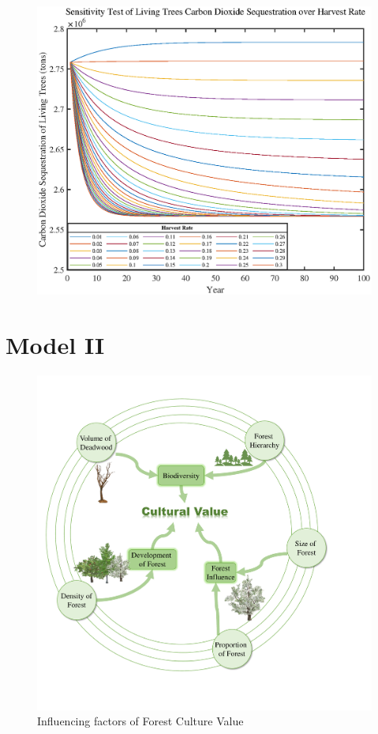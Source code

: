 \documentclass{mcmthesis}
\numberwithin{figure}{section}
\numberwithin{table}{section}
\numberwithin{equation}{section}
\begin{document}
\begin{figure}[htbp]
  \centering
  \includegraphics[width = 12cm]{code&pic/LivingTrees.eps}
\end{figure}

\section{Model II}
\begin{figure}[htbp]
  \centering
  \includegraphics[width = 12cm]{code&pic/Model2.pdf}
  \caption{Influencing factors of Forest Culture Value}
\end{figure}
\end{document}

